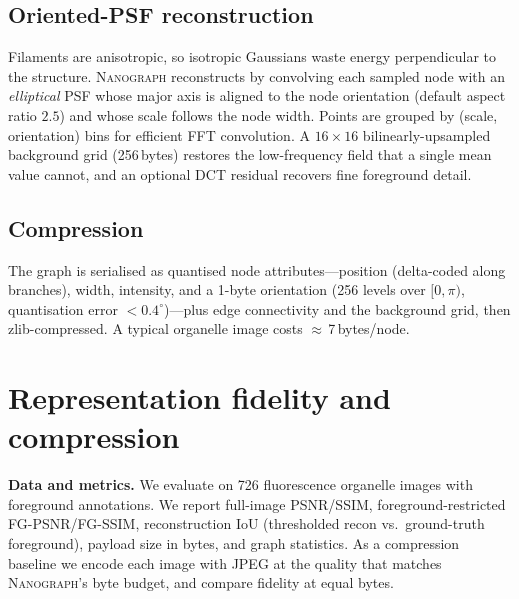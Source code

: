 \documentclass[runningheads]{llncs}
\newcommand{\method}{\textsc{Nanograph}\xspace}
\begin{document}
\subsection{Oriented-PSF reconstruction}
Filaments are anisotropic, so isotropic Gaussians waste energy perpendicular to
the structure. \method reconstructs by convolving each sampled node with an
\emph{elliptical} PSF whose major axis is aligned to the node orientation
(default aspect ratio $2.5$) and whose scale follows the node width. Points are
grouped by (scale, orientation) bins for efficient FFT convolution. A
$16\times16$ bilinearly-upsampled background grid (256\,bytes) restores the
low-frequency field that a single mean value cannot, and an optional DCT residual
recovers fine foreground detail.

\subsection{Compression}
The graph is serialised as quantised node attributes---position (delta-coded
along branches), width, intensity, and a 1-byte orientation (256 levels over
$[0,\pi)$, quantisation error $<0.4^\circ$)---plus edge connectivity and the
background grid, then zlib-compressed. A typical organelle image costs
$\approx$\,7\,bytes/node.

\section{Representation fidelity and compression}\label{sec:repr}
\noindent\textbf{Data and metrics.} We evaluate on 726 fluorescence organelle
images with foreground annotations. We report full-image PSNR/SSIM,
foreground-restricted FG-PSNR/FG-SSIM, reconstruction IoU (thresholded recon vs.\
ground-truth foreground), payload size in bytes, and graph statistics. As a
compression baseline we encode each image with JPEG at the quality that matches
\method's byte budget, and compare fidelity at equal bytes.
\end{document}
